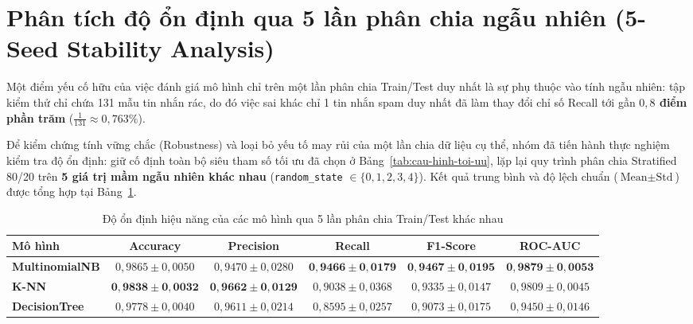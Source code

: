 \section{Phân tích độ ổn định qua 5 lần phân chia ngẫu nhiên (5-Seed Stability Analysis)}
\label{sec:do-on-dinh-seed}

Một điểm yếu cố hữu của việc đánh giá mô hình chỉ trên một lần phân chia Train/Test duy nhất là sự phụ thuộc vào tính ngẫu nhiên: tập kiểm thử chỉ chứa 131 mẫu tin nhắn rác, do đó việc sai khác chỉ 1 tin nhắn spam duy nhất đã làm thay đổi chỉ số Recall tới gần \textbf{$0,8$ điểm phần trăm} ($\frac{1}{131} \approx 0,763\%$).

Để kiểm chứng tính vững chắc (Robustness) và loại bỏ yếu tố may rủi của một lần chia dữ liệu cụ thể, nhóm đã tiến hành thực nghiệm kiểm tra độ ổn định: giữ cố định toàn bộ siêu tham số tối ưu đã chọn ở Bảng~\ref{tab:cau-hinh-toi-uu}, lặp lại quy trình phân chia Stratified 80/20 trên \textbf{5 giá trị mầm ngẫu nhiên khác nhau} (\texttt{random\_state} $\in \{0, 1, 2, 3, 4\}$). Kết quả trung bình và độ lệch chuẩn ($\text{Mean} \pm \text{Std}$) được tổng hợp tại Bảng~\ref{tab:seed-stability}.

\begin{table}[H]
\centering
\caption{Độ ổn định hiệu năng của các mô hình qua 5 lần phân chia Train/Test khác nhau}
\label{tab:seed-stability}
\begin{tabular}{|l|c|c|c|c|c|}
\hline
\textbf{Mô hình} & \textbf{Accuracy} & \textbf{Precision} & \textbf{Recall} & \textbf{F1-Score} & \textbf{ROC-AUC} \\
\hline
\textbf{MultinomialNB} & $0,9865 \pm 0,0050$ & $0,9470 \pm 0,0280$ & $\mathbf{0,9466 \pm 0,0179}$ & $\mathbf{0,9467 \pm 0,0195}$ & $\mathbf{0,9879 \pm 0,0053}$ \\
\hline
\textbf{K-NN} & $\mathbf{0,9838 \pm 0,0032}$ & $\mathbf{0,9662 \pm 0,0129}$ & $0,9038 \pm 0,0368$ & $0,9335 \pm 0,0147$ & $0,9809 \pm 0,0045$ \\
\hline
\textbf{DecisionTree} & $0,9778 \pm 0,0040$ & $0,9611 \pm 0,0214$ & $0,8595 \pm 0,0257$ & $0,9073 \pm 0,0175$ & $0,9450 \pm 0,0146$ \\
\hline
\end{tabular}
\end{table}

